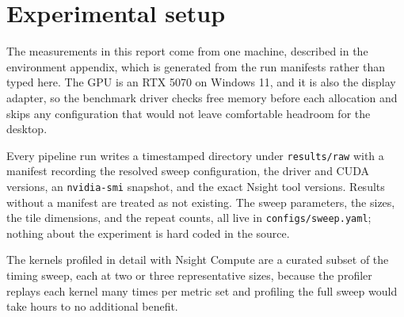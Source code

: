 \section{Experimental setup}

The measurements in this report come from one machine, described in the
environment appendix, which is generated from the run manifests rather than typed
here. The GPU is an RTX 5070 on Windows 11, and it is also the display adapter,
so the benchmark driver checks free memory before each allocation and skips any
configuration that would not leave comfortable headroom for the desktop.

Every pipeline run writes a timestamped directory under \texttt{results/raw} with
a manifest recording the resolved sweep configuration, the driver and CUDA
versions, an \texttt{nvidia-smi} snapshot, and the exact Nsight tool versions.
Results without a manifest are treated as not existing. The sweep parameters,
the sizes, the tile dimensions, and the repeat counts, all live in
\texttt{configs/sweep.yaml}; nothing about the experiment is hard coded in the
source.

The kernels profiled in detail with Nsight Compute are a curated subset of the
timing sweep, each at two or three representative sizes, because the profiler
replays each kernel many times per metric set and profiling the full sweep would
take hours to no additional benefit.

